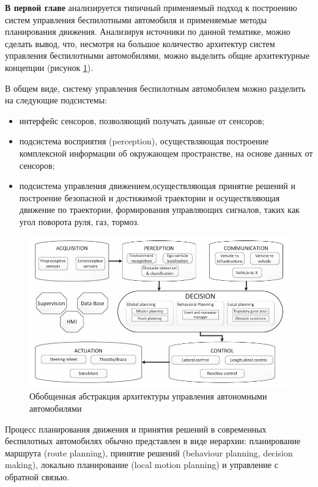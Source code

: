 \textbf{В первой главе} анализируется типичный применяемый подход к построению систем управления
беспилотными автомобиля и применяемые методы планирования движения. Анализируя источники по данной тематике,
можно сделать вывод, что, несмотря на большое количество архитектур систем управления беспилотными
автомобилями, можно выделить общие архитектурные концепции (рисунок \ref{img:general_arch}).

В общем виде, систему управления беспилотным автомобилем
можно разделить на следующие подсистемы:
\begin{itemize}
    \item интерфейс сенсоров, позволяющий получать данные от сенсоров;
    \item подсистема восприятия (perception), осуществляющая построение комплексной информации об
    окружающем пространстве, на основе данных от сенсоров;
    \item подсистема управления движением,осуществляющая принятие решений и построение безопасной
    и достижимой траектории и осуществляющая движение по траектории, формирования управляющих сигналов,
    таких как угол поворота руля, газ, тормоз.
\end{itemize}

\begin{figure}[h]
    \centering
    \includegraphics[width=\linewidth]{images/general_arch}
    \caption{Обобщенная абстракция архитектуры управления автономными автомобилями}
    \label{img:general_arch}
\end{figure}

Процесс планирования движения и принятия решений в современных беспилотных автомобилях обычно представлен в виде
иерархии: планирование маршрута (route planning), принятие решений (behaviour planning, decision making), локально планирование
(local motion planning) и управление с обратной связью.

